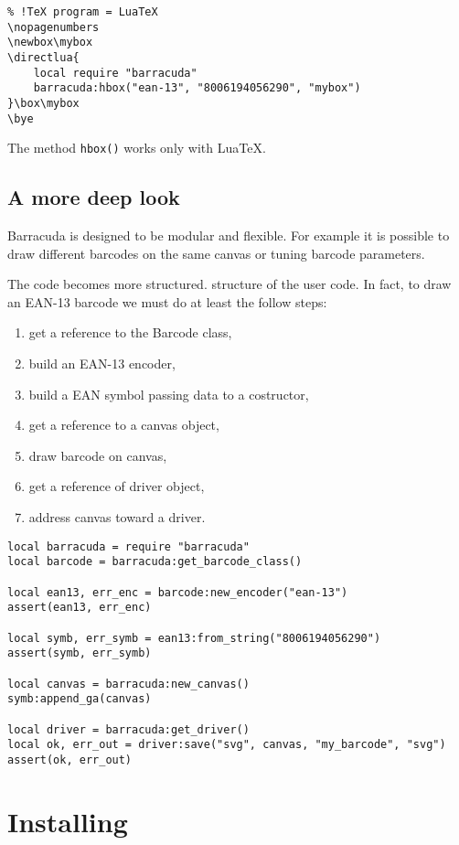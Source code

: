 \documentclass{article}
\newcommand{\code}[1]{\texttt{#1}}
\begin{document}
\begin{Verbatim}
% !TeX program = LuaTeX
\nopagenumbers
\newbox\mybox
\directlua{
	local require "barracuda"
	barracuda:hbox("ean-13", "8006194056290", "mybox")
}\box\mybox
\bye
\end{Verbatim}

The method \code{hbox()} works only with Lua\TeX{}.


\subsection{A more deep look}

Barracuda is designed to be modular and flexible. For example it is possible
to draw different barcodes on the same canvas or tuning barcode parameters.

The code becomes more structured.
structure of the user code. In fact, to draw an EAN-13 barcode we must do at
least the follow steps:
\begin{enumerate}
	\item get a reference to the Barcode class,
	\item build an EAN-13 encoder,
	\item build a EAN symbol passing data to a costructor,
	\item get a reference to a canvas object,
	\item draw barcode on canvas,
	\item get a reference of driver object,
	\item address canvas toward a driver.
\end{enumerate}

\begin{Verbatim}
local barracuda = require "barracuda"
local barcode = barracuda:get_barcode_class()

local ean13, err_enc = barcode:new_encoder("ean-13")
assert(ean13, err_enc)

local symb, err_symb = ean13:from_string("8006194056290")
assert(symb, err_symb)

local canvas = barracuda:new_canvas()
symb:append_ga(canvas)

local driver = barracuda:get_driver()
local ok, err_out = driver:save("svg", canvas, "my_barcode", "svg")
assert(ok, err_out)
\end{Verbatim}


\section{Installing}
\label{secInstall}
\end{document}
